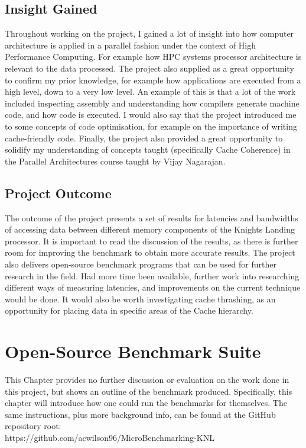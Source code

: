\documentclass[bsc,frontabs,twoside,singlespacing,parskip,deptreport]{infthesis}     %
\begin{document}
\section{Insight Gained}
Throughout working on the project, I gained a lot of insight into how computer architecture is applied in a parallel fashion under the context of High Performance Computing. For example how HPC systems processor architecture is relevant to the data processed. The project also supplied as a great opportunity to confirm my prior knowledge, for example how applications are executed from a high level, down to a very low level. An example of this is that a lot of the work included inspecting assembly and understanding how compilers generate machine code, and how code is executed. I would also say that the project introduced me to some concepts of code optimisation, for example on the importance of writing cache-friendly code. Finally, the project also provided a great opportunity to solidify my understanding of concepts taught (specifically Cache Coherence) in the Parallel Architectures course taught by Vijay Nagarajan.

\section{Project Outcome}
The outcome of the project presents a set of results for latencies and bandwidths of accessing data between different memory components of the Knights Landing processor. It is important to read the discussion of the results, as there is further room for improving the benchmark to obtain more accurate results. The project also delivers open-source benchmark programs that can be used for further research in the field. Had more time been available, further work into researching different ways of measuring latencies, and improvements on the current technique would be done. It would also be worth investigating cache thrashing, as an opportunity for placing data in specific areas of the Cache hierarchy.

\chapter{Open-Source Benchmark Suite}\label{chap:benchmark-suite}
This Chapter provides no further discussion or evaluation on the work done in this project, but shows an outline of the benchmark produced. Specifically, this chapter will introduce how one could run the benchmarks for themselves. The same instructions, plus more background info, can be found at the GitHub repository root: \\
https://github.com/acwilson96/MicroBenchmarking-KNL
\end{document}
